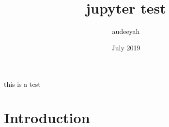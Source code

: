 \documentclass{article}
\title{jupyter test}
\author{audeeyah }
\date{July 2019}
\begin{document}
\maketitle this is a test

\section{Introduction}
\end{document}
